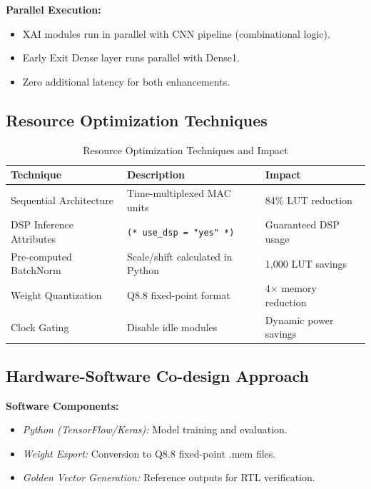 \documentclass[11pt, a4paper]{article}
\begin{document}
\textbf{Parallel Execution:}
\begin{itemize}
    \item XAI modules run in parallel with CNN pipeline (combinational logic).
    \item Early Exit Dense layer runs parallel with Dense1.
    \item Zero additional latency for both enhancements.
\end{itemize}

\subsection{Resource Optimization Techniques}

\begin{table}[H]
\centering
\caption{Resource Optimization Techniques and Impact}
\label{tab:optimizations}
\begin{tabular}{@{}lll@{}}
\toprule
\textbf{Technique} & \textbf{Description} & \textbf{Impact} \\ \midrule
Sequential Architecture & Time-multiplexed MAC units & 84\% LUT reduction \\
DSP Inference Attributes & \texttt{(* use\_dsp = "yes" *)} & Guaranteed DSP usage \\
Pre-computed BatchNorm & Scale/shift calculated in Python & 1,000 LUT savings \\
Weight Quantization & Q8.8 fixed-point format & 4$\times$ memory reduction \\
Clock Gating & Disable idle modules & Dynamic power savings \\ \bottomrule
\end{tabular}
\end{table}

\subsection{Hardware-Software Co-design Approach}

\textbf{Software Components:}
\begin{itemize}
    \item \textit{Python (TensorFlow/Keras):} Model training and evaluation.
    \item \textit{Weight Export:} Conversion to Q8.8 fixed-point .mem files.
    \item \textit{Golden Vector Generation:} Reference outputs for RTL verification.
\end{itemize}
\end{document}
